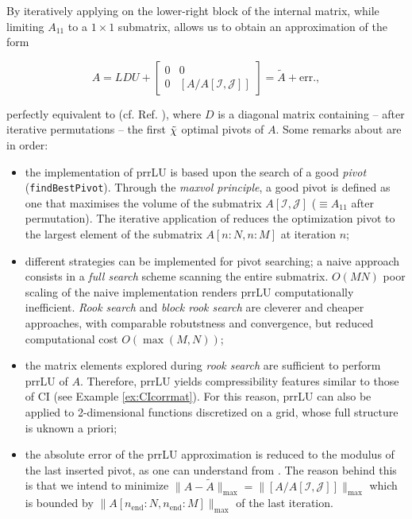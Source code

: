 By iteratively applying  on the lower-right block of the internal matrix, while limiting $A_{11}$ to a $1\times 1$ submatrix,  allows us to obtain an approximation of the form 

\begin{equation}
	A = LDU + \begin{bmatrix}
		0 & 0\\
		0 & [A/A[\mathcal{I}, \mathcal{J}]]
	\end{bmatrix} = \tilde{A} + \textrm{err.},
\end{equation}

perfectly equivalent to  (cf. Ref. \cite{Fernandez2024}), where $D$ is a diagonal matrix containing -- after iterative permutations -- the first ${\tilde \chi}$ optimal pivots of $A$.
Some remarks about  are in order: 
\begin{itemize}
	\item the implementation of prrLU is based upon the search of a good \textit{pivot} (\texttt{findBestPivot}). Through the \textit{maxvol principle}, a good pivot is defined as one that maximises the volume of the submatrix $A[\mathcal{I}, \mathcal{J}]$ ($\equiv A_{11}$ after permutation). The iterative application of  reduces the optimization pivot to the largest element of the submatrix $A[n\!:\!N, n\!:\!M]$ at iteration $n$;
	\item different strategies can be implemented for pivot searching; a naive approach consists in a \textit{full search} scheme scanning the entire submatrix. $O(MN)$ poor scaling of the naive implementation renders prrLU computationally inefficient. \textit{Rook search} \cite{Poole2000} and \textit{block rook search} \cite{Fernandez2024} are cleverer and cheaper approaches, with comparable robutstness and convergence, but reduced computational cost $O(\max\left(M,N\right))$;  
	\item the matrix elements explored during \textit{rook search} are sufficient to perform prrLU of $A$. Therefore, prrLU yields compressibility features similar to those of CI (see Example \ref{ex:CIcorrmat}). For this reason, prrLU can also be applied to 2-dimensional functions discretized on a grid, whose full structure is uknown a priori; 	
	\item the absolute error of the prrLU approximation is reduced to the modulus of the last inserted pivot, as one can understand from . The reason behind this is that we intend to minimize $\parallel\! A - \tilde{A}\!\parallel_{\textrm{max}} = \parallel\![A/A[\mathcal{I}, \mathcal{J}]] \!\parallel_{\textrm{max}}$ which is bounded by $\parallel\! A[n_{\textrm{end}}\!:\!N, n_{\textrm{end}}\!:\!M]\!\parallel_{\textrm{max}}$ of the last iteration.  
\end{itemize}


